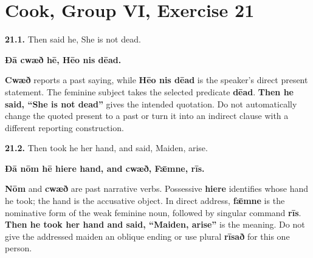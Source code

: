 \section*{Cook, Group VI, Exercise 21}

\par\begin{minipage}{\linewidth}\raggedright
\textbf{21.1.} Then said he, She is not dead.

\textbf{Ðā cwæð hē, Hēo nis dēad.}

\textbf{Cwæð} reports a past saying, while \textbf{Hēo nis dēad} is the speaker's direct present statement. The feminine subject takes the selected predicate \textbf{dēad}. \textbf{Then he said, “She is not dead”} gives the intended quotation. Do not automatically change the quoted present to a past or turn it into an indirect clause with a different reporting construction.

\end{minipage}\par\addvspace{4pt}

\par\begin{minipage}{\linewidth}\raggedright
\textbf{21.2.} Then took he her hand, and said, Maiden, arise.

\textbf{Ðā nōm hē hiere hand, and cwæð, Fǣmne, rīs.}

\textbf{Nōm} and \textbf{cwæð} are past narrative verbs. Possessive \textbf{hiere} identifies whose hand he took; the hand is the accusative object. In direct address, \textbf{fǣmne} is the nominative form of the weak feminine noun, followed by singular command \textbf{rīs}. \textbf{Then he took her hand and said, “Maiden, arise”} is the meaning. Do not give the addressed maiden an oblique ending or use plural \textbf{rīsað} for this one person.

\end{minipage}\par\addvspace{4pt}

